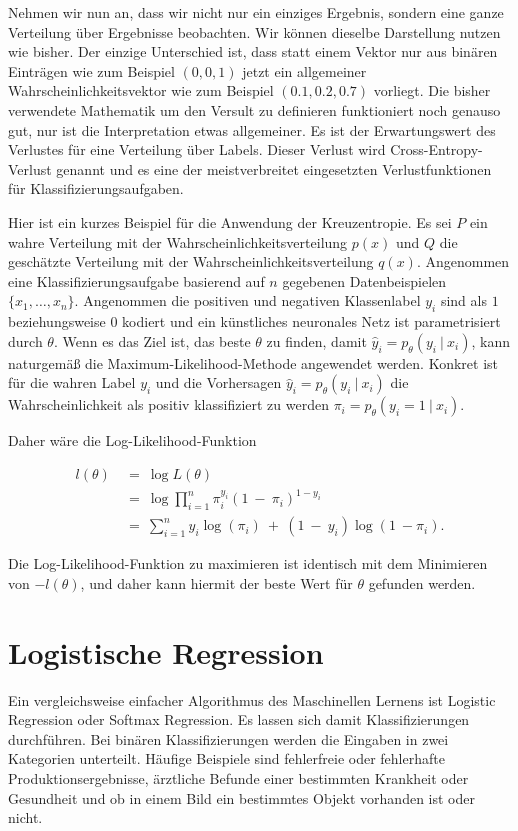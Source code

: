 Nehmen wir nun an, dass wir nicht nur ein einziges Ergebnis, sondern eine ganze Verteilung über Ergebnisse beobachten. Wir können dieselbe Darstellung nutzen wie bisher. Der einzige Unterschied ist, dass statt einem Vektor nur aus binären Einträgen wie zum Beispiel $(0, 0, 1)$ jetzt ein allgemeiner Wahrscheinlichkeitsvektor wie zum Beispiel $(0.1, 0.2, 0.7)$ vorliegt. Die bisher verwendete Mathematik um den Versult zu definieren funktioniert noch genauso gut, nur ist die Interpretation etwas allgemeiner. Es ist der Erwartungswert des Verlustes für eine Verteilung über Labels. Dieser Verlust wird Cross-Entropy-Verlust genannt und es eine der meistverbreitet eingesetzten Verlustfunktionen für Klassifizierungsaufgaben.

Hier ist ein kurzes Beispiel für die Anwendung der Kreuzentropie. Es sei $P$ ein wahre Verteilung mit der Wahrscheinlichkeitsverteilung $p(x)$ und $Q$ die geschätzte Verteilung mit der Wahrscheinlichkeitsverteilung $q(x)$. Angenommen eine Klassifizierungsaufgabe basierend auf $n$ gegebenen Datenbeispielen $\{x_{1}, \dots, x_{n}\}$. Angenommen die positiven und negativen Klassenlabel $y_{i}$ sind als $1$ beziehungsweise $0$ kodiert und ein künstliches neuronales Netz ist parametrisiert durch $\theta$. Wenn es das Ziel ist, das beste $\theta$ zu finden, damit $\hat{y}_{i} = p_{\theta}(y_{i}\ |\ x_{i})$, kann naturgemäß die Maximum-Likelihood-Methode angewendet werden. Konkret ist für die wahren Label $y_{i}$ und die Vorhersagen $\hat{y}_{i} = p_{\theta}(y_{i}\ |\ x_{i})$ die Wahrscheinlichkeit als positiv klassifiziert zu werden $\pi_{i} = p_{\theta}(y_{i} = 1\ |\ x_{i})$.

Daher wäre die Log-Likelihood-Funktion

\begin{align}
  l(\theta)\ &=\ \log L(\theta) \\
  &=\ \log\prod_{i=1}^{n}\pi_{i}^{y_{i}} (1\ -\ \pi_{i})^{1-y_{i}} \tag*{}\\
  &=\ \sum_{i=1}^{n}y_{i}\log(\pi_{i})\ +\ (1\ -\ y_{i})\log(1\ - \pi_{i}). \tag*{}
\end{align}

Die Log-Likelihood-Funktion zu maximieren ist identisch mit dem Minimieren von $-l(\theta)$, und daher kann hiermit der beste Wert für $\theta$ gefunden werden.
\cite{zhang2020dive}

\section{Logistische Regression}
\label{sec:logreg}
Ein vergleichsweise einfacher Algorithmus des Maschinellen Lernens ist Logistic Regression oder Softmax Regression. Es lassen sich damit Klassifizierungen durchführen. Bei binären Klassifizierungen werden die Eingaben in zwei Kategorien unterteilt. Häufige Beispiele sind fehlerfreie oder fehlerhafte Produktionsergebnisse, ärztliche Befunde einer bestimmten Krankheit oder Gesundheit und ob in einem Bild ein bestimmtes Objekt vorhanden ist oder nicht.

